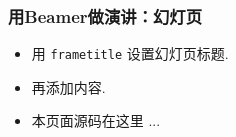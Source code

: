 \begin{CJK*}{UTF8}{gbsn}
\begin{frame}
  \frametitle{用Beamer做演讲：幻灯页}
  \begin{itemize}
    \item 用 \texttt{frametitle} 设置幻灯页标题.
    \item 再添加内容.
    \item 本页面源码在这里 ... 
  \end{itemize}
\end{frame}
\clearpage\end{CJK*}
